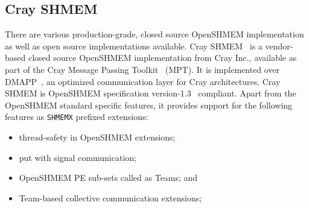 \subsection{Cray SHMEM}
\label{src:bg/crayshmem}
There are various production-grade, closed source OpenSHMEM implementation as well
as open source implementations available. Cray SHMEM~\cite{csma} is a vendor-based
closed source OpenSHMEM implementation from Cray Inc., available as part of the Cray
Message Passing Toolkit~\cite{mpt} (MPT). It is implemented over DMAPP~\cite{dmapp},
an optimized communication layer for Cray architectures. Cray SHMEM is OpenSHMEM
specification version-1.3~\cite{osm13} compliant. Apart from the OpenSHMEM standard
specific features, it provides support for the following features as \texttt{SHMEMX}
prefixed extensions:
\begin{itemize}
    \item thread-safety in OpenSHMEM extensions;
    \item put with signal communication;
    \item OpenSHMEM PE sub-sets called as Teams; and
    \item Team-based collective communication extensions;
\end{itemize}
